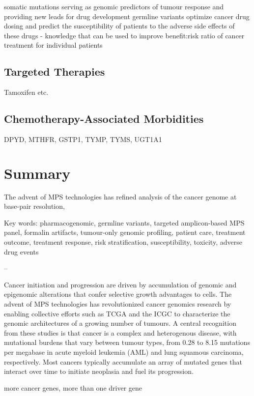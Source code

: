 somatic mutations serving as genomic predictors of tumour response and providing new leads for drug development
germline variants optimize cancer drug dosing and predict the susceptibility of patients to the adverse side effects of these drugs - knowledge that can be used to improve benefit:risk ratio of cancer treatment for individual patients

\subsection{Targeted Therapies}
Tamoxifen etc.

\subsection{Chemotherapy-Associated Morbidities}
DPYD, MTHFR, GSTP1, TYMP, TYMS, UGT1A1

\section{Summary}
\label{sec:Summary}

The advent of MPS technologies has refined analysis of the cancer genome at base-pair resolution,



Key words: pharmacogenomic, germline variants, targeted amplicon-based MPS panel, formalin artifacts, tumour-only genomic profiling, patient care, treatment outcome, treatment response, risk stratification, susceptibility, toxicity, adverse drug events

--

Cancer initiation and progression are driven by accumulation of genomic and epigenomic alterations that confer selective growth advantages to cells. The advent of MPS technologies has revolutionized cancer genomics research by enabling collective efforts such as TCGA and the ICGC to characterize the genomic architectures of a growing number of tumours. A central recognition from these studies is that cancer is a complex and heterogenous disease, with mutational burdens that vary between tumour types, from 0.28 to 8.15 mutations per megabase in acute myeloid leukemia (AML) and lung squamous carcinoma, respectively. Most cancers typically accumulate an array of mutated genes that interact over time to initiate neoplasia and fuel its progression.

more cancer genes, more than one driver gene

